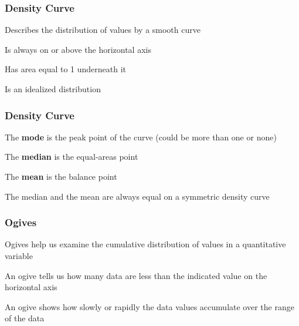 \documentclass[12pt]{beamer}\usepackage[]{graphicx}\usepackage[]{color}
\begin{document}

\begin{frame}
\frametitle{Density Curve}

\bi
  \item Describes the distribution of values by a smooth curve
  \item Is always on or above the horizontal axis
  \item Has area equal to 1 underneath it
  \item Is an idealized distribution
\ei
\eb

\end{frame}


\begin{frame}
\frametitle{Density Curve}

\bi
  \item The \textbf{mode} is the peak point of the curve (could be more than one or none)
  \item The \textbf{median} is the equal-areas point
  \item The \textbf{mean} is the balance point
  \item The median and the mean are always equal on a symmetric density curve
\ei
\eb

\end{frame}


\begin{frame}
\begin{center}
\Huge{}
\end{center}
\end{frame}


\begin{frame}
\frametitle{Ogives}

\bbi
  \item Ogives help us examine the cumulative distribution of values in a quantitative variable
  \item An ogive tells us how many data are less than the indicated value on the horizontal axis
  \item An ogive shows how slowly or rapidly the data values accumulate over the range of the data
\ei
\eb

\end{frame}
\end{document}
